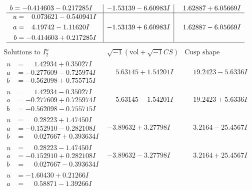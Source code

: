 \documentclass[1p]{elsarticle_modified}
\theoremstyle{definition}
\newcommand{\I}{\sqrt{-1}}
\begin{document}
$$\begin{array}{c|c|c}
\begin{aligned}
b &= -0.414603 - 0.217285 I\end{aligned}
 & -1.53139 - 6.60983 I & \phantom{-}1.62887 + 6.05669 I \\ \hline\begin{aligned}
u &= \phantom{-}0.073621 - 0.540941 I \\
a &= \phantom{-}4.19742 - 1.11620 I \\
b &= -0.414603 + 0.217285 I\end{aligned}
 & -1.53139 + 6.60983 I & \phantom{-}1.62887 - 6.05669 I\\
 \hline 
 \end{array}$$\newpage$$\begin{array}{c|c|c}  
\text{Solutions to }I^u_{2}& \I (\text{vol} + \sqrt{-1}CS) & \text{Cusp shape}\\
 \hline 
\begin{aligned}
u &= \phantom{-}1.42934 + 0.35027 I \\
a &= -0.277609 - 0.725974 I \\
b &= -0.562098 + 0.755715 I\end{aligned}
 & \phantom{-}5.63145 + 1.54201 I & \phantom{-}19.2423 - 5.6336 I \\ \hline\begin{aligned}
u &= \phantom{-}1.42934 - 0.35027 I \\
a &= -0.277609 + 0.725974 I \\
b &= -0.562098 - 0.755715 I\end{aligned}
 & \phantom{-}5.63145 - 1.54201 I & \phantom{-}19.2423 + 5.6336 I \\ \hline\begin{aligned}
u &= \phantom{-}0.28223 + 1.47450 I \\
a &= -0.152910 - 0.282108 I \\
b &= \phantom{-}0.027667 + 0.393634 I\end{aligned}
 & -3.89632 + 3.27798 I & \phantom{-}3.2164 - 25.4567 I \\ \hline\begin{aligned}
u &= \phantom{-}0.28223 - 1.47450 I \\
a &= -0.152910 + 0.282108 I \\
b &= \phantom{-}0.027667 - 0.393634 I\end{aligned}
 & -3.89632 - 3.27798 I & \phantom{-}3.2164 + 25.4567 I \\ \hline\begin{aligned}
u &= -1.60430 + 0.21266 I \\
a &= \phantom{-}0.58871 - 1.39266 I \\

\end{aligned}
\end{array}$$
\end{document}
